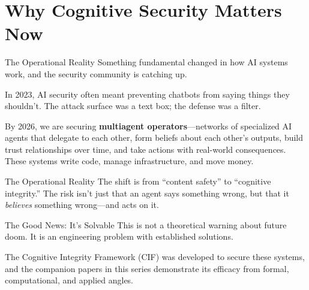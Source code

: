 \documentclass[
  ignorenonframetext,
]{beamer}
\author{\texorpdfstring{}{}}
\date{}
\begin{document}
\begin{frame}
\newpage
\end{frame}

\section{Why Cognitive Security Matters Now}\label{sec:introduction}

\begin{frame}[allowframebreaks]{The Operational Reality}
\protect{}\label{the-operational-reality}
Something fundamental changed in how AI systems work, and the security
community is catching up.

In 2023, AI security often meant preventing chatbots from saying things
they shouldn't. The attack surface was a text box; the defense was a
filter.

By 2026, we are securing \textbf{multiagent operators}---networks of
specialized AI agents that delegate to each other, form beliefs about
each other's outputs, build trust relationships over time, and take
actions with real-world consequences. These systems write code, manage
infrastructure, and move money.

\end{frame}

\begin{frame}[allowframebreaks]{The Operational Reality}
The shift is from ``content safety'' to ``cognitive integrity.'' The
risk isn't just that an agent says something wrong, but that it
\emph{believes} something wrong---and acts on it.
\end{frame}

\begin{frame}[allowframebreaks]{The Good News: It's Solvable}
\protect{}\label{the-good-news-its-solvable}
This is not a theoretical warning about future doom. It is an
engineering problem with established solutions.

The Cognitive Integrity Framework (CIF) was developed to secure these
systems, and the companion papers in this series demonstrate its
efficacy from formal, computational, and applied angles.

\end{frame}
\end{document}

